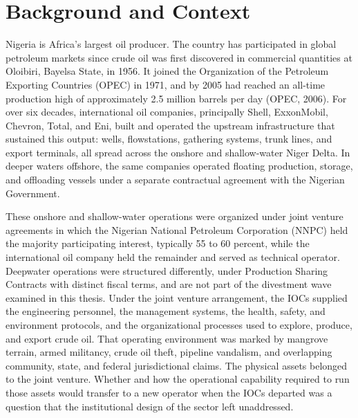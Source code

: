 \documentclass[twoside,fontset=lmodern]{mitthesis}
\begin{document}
\hypertarget{background-and-context}{%
\section{Background and Context}\label{background-and-context}}

Nigeria is Africa's largest oil producer. The country has participated
in global petroleum markets since crude oil was first discovered in
commercial quantities at Oloibiri, Bayelsa State, in 1956. It joined the
Organization of the Petroleum Exporting Countries (OPEC) in 1971, and by
2005 had reached an all-time production high of approximately 2.5
million barrels per day (OPEC, 2006). For over six decades,
international oil companies, principally Shell, ExxonMobil, Chevron,
Total, and Eni, built and operated the upstream infrastructure that
sustained this output: wells, flowstations, gathering systems, trunk
lines, and export terminals, all spread across the onshore and
shallow-water Niger Delta. In deeper waters offshore, the same companies
operated floating production, storage, and offloading vessels under a
separate contractual agreement with the Nigerian Government.

These onshore and shallow-water operations were organized under joint
venture agreements in which the Nigerian National Petroleum Corporation
(NNPC) held the majority participating interest, typically 55 to 60
percent, while the international oil company held the remainder and
served as technical operator. Deepwater operations were structured
differently, under Production Sharing Contracts with distinct fiscal
terms, and are not part of the divestment wave examined in this thesis.
Under the joint venture arrangement, the IOCs supplied the engineering
personnel, the management systems, the health, safety, and environment
protocols, and the organizational processes used to explore, produce,
and export crude oil. That operating environment was marked by mangrove
terrain, armed militancy, crude oil theft, pipeline vandalism, and
overlapping community, state, and federal jurisdictional claims. The
physical assets belonged to the joint venture. Whether and how the
operational capability required to run those assets would transfer to a
new operator when the IOCs departed was a question that the
institutional design of the sector left unaddressed.
\end{document}

